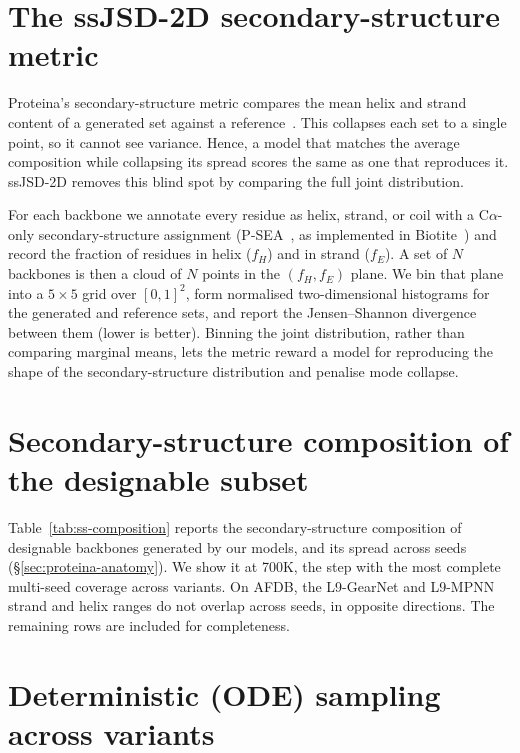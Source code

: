 \documentclass[12pt,a4paper,twoside]{report}
\begin{document}


\section{The ssJSD-2D secondary-structure metric}
\label{app:ssjsd}

Proteina's secondary-structure metric compares the mean helix and strand content of a generated set against a reference~\cite{Proteina}. This collapses each set to a single point, so it cannot see variance. Hence, a model that matches the average composition while collapsing its spread scores the same as one that reproduces it. ssJSD-2D removes this blind spot by comparing the full joint distribution.

For each backbone we annotate every residue as helix, strand, or coil with a C$\alpha$-only secondary-structure assignment (P-SEA~\cite{PSEA}, as implemented in Biotite~\cite{Biotite}) and record the fraction of residues in helix ($f_H$) and in strand ($f_E$). A set of $N$ backbones is then a cloud of $N$ points in the $(f_H, f_E)$ plane. We bin that plane into a $5\times5$ grid over $[0,1]^2$, form normalised two-dimensional histograms for the generated and reference sets, and report the Jensen--Shannon divergence between them (lower is better). Binning the joint distribution, rather than comparing marginal means, lets the metric reward a model for reproducing the shape of the secondary-structure distribution and penalise mode collapse.

\section{Secondary-structure composition of the designable subset}
\label{app:ss-composition}

Table~\ref{tab:ss-composition} reports the secondary-structure composition of designable backbones generated by our models, and its spread across seeds (\S\ref{sec:proteina-anatomy}). We show it at 700K, the step with the most complete multi-seed coverage across variants. On AFDB, the L9-GearNet and L9-MPNN strand and helix ranges do not overlap across seeds, in opposite directions. The remaining rows are included for completeness.



\section{Deterministic (ODE) sampling across variants}
\label{app:ode}
\end{document}
